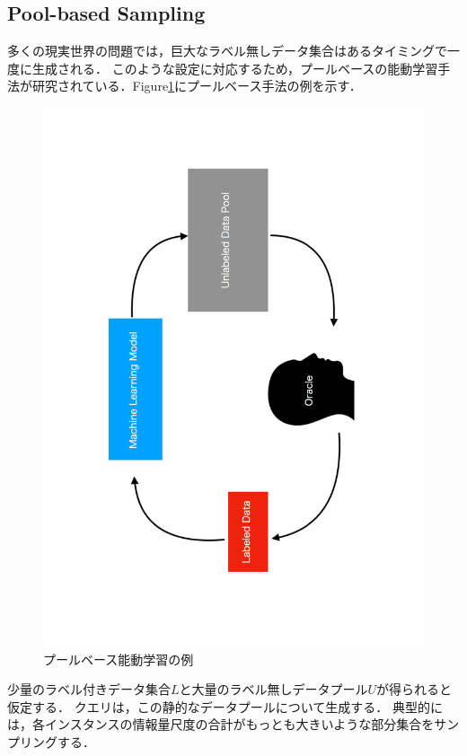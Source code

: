 \documentclass[11pt]{report}
\begin{document}
\subsection{Pool-based Sampling}
多くの現実世界の問題では，巨大なラベル無しデータ集合はあるタイミングで一度に生成される．
このような設定に対応するため，プールベースの能動学習手法が研究されている．Figure\ref{fig1}にプールベース手法の例を示す．

\begin{figure}[h]
\begin{center}
\includegraphics[bb=100 0 470 850, scale=0.4, angle=270]{./images/fig1.pdf}
\vspace{5mm}
\caption{プールベース能動学習の例}
\label{fig1}
\end{center}
\end{figure}

少量のラベル付きデータ集合$L$と大量のラベル無しデータプール$U$が得られると仮定する．
クエリは，この静的なデータプールについて生成する．
典型的には，各インスタンスの情報量尺度の合計がもっとも大きいような部分集合をサンプリングする．
\end{document}

